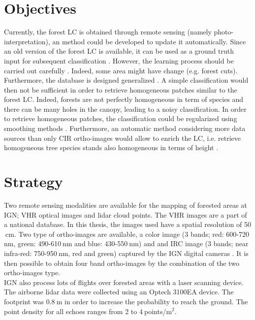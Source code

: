 \section{Objectives}
Currently, the forest LC is obtained through remote sensing (namely photo-inter\-pretation), an method could be developed to update it automatically. Since an old version of the forest LC is available, it can be used as a ground truth input for subsequent classification \citep{gressin2013updating}. However, the learning process should be carried out carefully \citep{gressin2014updating}. Indeed, some area might have change (e.g. forest cuts). Furthermore, the database is designed generalized \citep{smith1977database}. A simple classification would then not be sufficient in order to retrieve homogeneous patches similar to the forest LC. Indeed, forests are not perfectly homogeneous in term of species and there can be many holes in the canopy, leading to a noisy classification. In order to retrieve homogeneous patches, the classification could be regularized using smoothing methods \citep{schindler2012overview}. Furthermore, an automatic method considering more data sources than only CIR ortho-images would allow to enrich the LC, i.e. retrieve homogeneous tree species stands also homogeneous in terms of height \citep{gressin2014unified}.

\section{Strategy}
Two remote sensing modalities are available for the mapping of forested areas at IGN; VHR optical images and lidar cloud points. The VHR images are a part of a national database. In this thesis, the images used have a spatial resolution of 50$\:$cm. Two type of ortho-images are available, a color image (3 bands; red: 600-720$\:$nm, green: 490-610$\:$nm and blue: 430-550$\:$nm) and and IRC image (3 bands; near infra-red: 750-950$\:$nm, red and green) captured by the IGN digital cameras \citep{souchon2012large}. It is then possible to obtain four band ortho-images by the combination of the two ortho-images type. \\
IGN also process lots of flights over forested areas with a laser scanning device. The airborne lidar data were collected using an Optech 3100EA device. The footprint was 0.8$\:$m in order to increase the probability to reach the ground. The point density {for all echoes} ranges from 2 to 4$\:$points/m$^{2}$. \\

